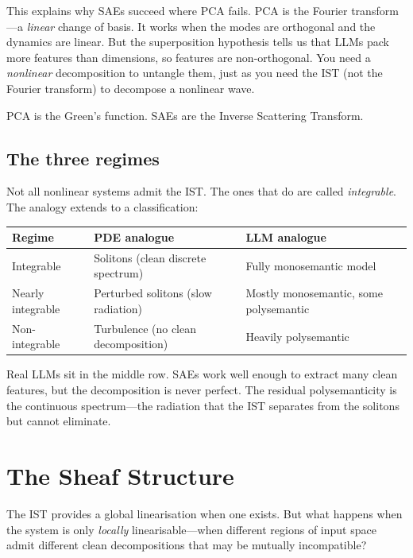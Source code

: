 \documentclass[11pt,a4paper]{article}
\begin{document}
This explains why SAEs succeed where PCA fails. PCA is the Fourier transform---a
\emph{linear} change of basis. It works when the modes are orthogonal and the
dynamics are linear. But the superposition hypothesis tells us that LLMs pack
more features than dimensions, so features are non-orthogonal. You need a
\emph{nonlinear} decomposition to untangle them, just as you need the IST
(not the Fourier transform) to decompose a nonlinear wave.

PCA is the Green's function. SAEs are the Inverse Scattering Transform.

\subsection{The three regimes}

Not all nonlinear systems admit the IST. The ones that do are called
\emph{integrable}. The analogy extends to a classification:

\medskip
\begin{center}
\renewcommand{\arraystretch}{1.3}
\begin{tabular}{@{}lll@{}}
\toprule
\textbf{Regime} & \textbf{PDE analogue} & \textbf{LLM analogue} \\
\midrule
Integrable & Solitons (clean discrete spectrum) & Fully monosemantic model \\
Nearly integrable & Perturbed solitons (slow radiation) & Mostly monosemantic, some polysemantic \\
Non-integrable & Turbulence (no clean decomposition) & Heavily polysemantic \\
\bottomrule
\end{tabular}
\end{center}

\medskip
Real LLMs sit in the middle row. SAEs work well enough to extract many clean
features, but the decomposition is never perfect. The residual polysemanticity
is the continuous spectrum---the radiation that the IST separates from the
solitons but cannot eliminate.

\section{The Sheaf Structure}

The IST provides a global linearisation when one exists. But what happens when
the system is only \emph{locally} linearisable---when different regions of input
space admit different clean decompositions that may be mutually incompatible?
\end{document}
